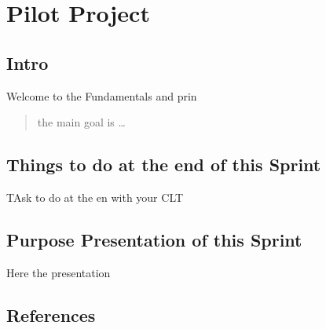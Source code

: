 \documentclass[
]{book}
\begin{document}
\hypertarget{pilot-project}{%
\chapter{Pilot Project}\label{pilot-project}}

\hypertarget{intro-6}{%
\section{Intro}\label{intro-6}}

Welcome to the Fundamentals and prin

\begin{quote}
the main goal is \ldots{}
\end{quote}

\hypertarget{things-to-do-at-the-end-of-this-sprint-4}{%
\section{Things to do at the end of this Sprint}\label{things-to-do-at-the-end-of-this-sprint-4}}

TAsk to do at the en with your CLT

\hypertarget{purpose-presentation-of-this-sprint-4}{%
\section{Purpose Presentation of this Sprint}\label{purpose-presentation-of-this-sprint-4}}

Here the presentation

\hypertarget{references-5}{%
\section{References}\label{references-5}}

  
\end{document}
